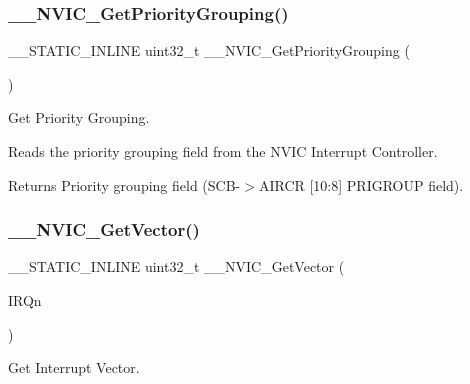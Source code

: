 \subsubsection{\texorpdfstring{\+\_\+\+\_\+\+N\+V\+I\+C\+\_\+\+Get\+Priority\+Grouping()}{\_\_NVIC\_GetPriorityGrouping()}}
{\footnotesize\ttfamily \+\_\+\+\_\+\+S\+T\+A\+T\+I\+C\+\_\+\+I\+N\+L\+I\+NE uint32\+\_\+t \+\_\+\+\_\+\+N\+V\+I\+C\+\_\+\+Get\+Priority\+Grouping (\begin{DoxyParamCaption}\item[{void}]{ }\end{DoxyParamCaption})}



Get Priority Grouping. 

Reads the priority grouping field from the N\+V\+IC Interrupt Controller. \begin{DoxyReturn}{Returns}
Priority grouping field (S\+C\+B-\/$>$A\+I\+R\+CR \mbox{[}10\+:8\mbox{]} P\+R\+I\+G\+R\+O\+UP field). 
\end{DoxyReturn}
\mbox{\label{group___c_m_s_i_s___core___n_v_i_c_functions_ga44b665d2afb708121d9b10c76ff00ee5}} 
\subsubsection{\texorpdfstring{\+\_\+\+\_\+\+N\+V\+I\+C\+\_\+\+Get\+Vector()}{\_\_NVIC\_GetVector()}}
{\footnotesize\ttfamily \+\_\+\+\_\+\+S\+T\+A\+T\+I\+C\+\_\+\+I\+N\+L\+I\+NE uint32\+\_\+t \+\_\+\+\_\+\+N\+V\+I\+C\+\_\+\+Get\+Vector (\begin{DoxyParamCaption}\item[{\hyperlink{group___peripheral__interrupt__number__definition_ga7e1129cd8a196f4284d41db3e82ad5c8}{I\+R\+Qn\+\_\+\+Type}}]{I\+R\+Qn }\end{DoxyParamCaption})}



Get Interrupt Vector. 

